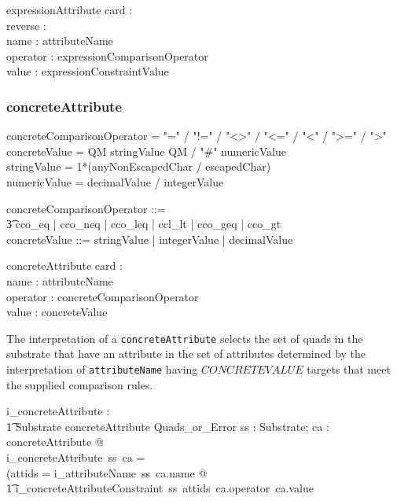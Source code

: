 \documentclass{article}
\def\spec#1{{\tt #1}}
\def\bnf#1{{\scriptsize {{#1}} }}
\begin{document}
\begin{schema}{expressionAttribute}
	card : \optional[cardinality] \\
	reverse : \optional[reverseFlag] \\
	name : attributeName \\
	operator : expressionComparisonOperator \\
	value : expressionConstraintValue
\end{schema}


\subsubsection{concreteAttribute}
\begin{framed}
\noindent
\bnf{concreteComparisonOperator = "=" / "!=" /  "\textless\textgreater" / "\textless=" / "\textless" / "\textgreater=" / "\textgreater"} \\
\bnf{concreteValue =  QM stringValue QM / "\#" numericValue} \\
\bnf{stringValue = 1*(anyNonEscapedChar / escapedChar)} \\
\bnf{numericValue = decimalValue / integerValue}
\end{framed}
\begin{zed}
concreteComparisonOperator ::= \\
\t3 cco\_eq | cco\_neq | cco\_leq | ccl\_lt | cco\_geq | cco\_gt \\
concreteValue ::= stringValue | integerValue | decimalValue
\end{zed}


\begin{schema}{concreteAttribute}
	card : \optional[cardinality] \\
	name : attributeName \\
	operator : concreteComparisonOperator \\
	value : concreteValue
\end{schema}


The interpretation of a \spec{concreteAttribute} selects the set of quads in the substrate that have an attribute in the set of attributes 
determined by the interpretation of \spec{attributeName} having $CONCRETEVALUE$ targets that meet the supplied comparison rules.

\begin{gendef}
   i\_concreteAttribute : \\
\t1 Substrate \fun concreteAttribute \fun Quads\_or\_Error
\where
   \forall ss : Substrate; ca : concreteAttribute @ \\
   i\_concreteAttribute~ss~ca = \\
   (\LET attids = i\_attributeName~ss~ca.name @ \\
\t1 i\_concreteAttributeConstraint~ss~attids~ca.operator~ca.value
\end{gendef}
\end{document}
